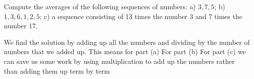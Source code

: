 
Compute the averages of the following sequences of numbers: a) $3,7,5$;  b) $1,3,6,1,2,5$;  c) a sequence consisting of 13 times the number 3 and 7 times the number 17. 

\solution
We find the solution by adding up all the numbers and dividing by the number of numbers that we added up. This means for part (a)
For part (b)
For part (c) we can save us some work by using multiplication to add up the numbers rather than adding them up term by term 
